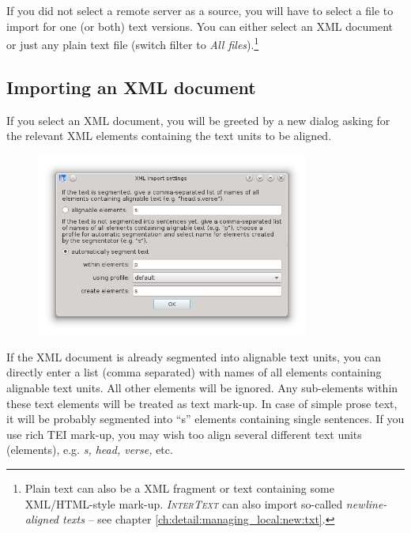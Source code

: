 \documentclass[a4paper,10pt,oneside]{book}
\newcommand{\IT}{\textit{\textsc{InterText}}\xspace}
\begin{document}
If you did not select a remote server as a source, you will have to select a file to import for one (or both) text versions. You can either select an XML document or just any plain text file (switch filter to \emph{All files}).\footnote{Plain text can also be a XML fragment or text containing some XML/HTML-style mark-up. \IT can also import so-called \emph{newline-aligned texts} -- see chapter \ref{ch:detail:managing_local:new:txt}.}

\subsection{Importing an XML document}\label{ch:detail:managing_local:new:xml}

If you select an XML document, you will be greeted by a new dialog asking for the relevant XML elements containing the text units to be aligned.

\begin{figure}[htb]
 \includegraphics[width=0.8\textwidth]{screenshots/xml_import.png}
\end{figure}

If the XML document is already segmented into alignable text units, you can directly enter a list (comma separated) with names of all elements containing alignable text units. All other elements will be ignored. Any sub-elements within these text elements will be treated as text mark-up. In case of simple prose text, it will be probably segmented into ``s'' elements containing single sentences. If you use rich TEI mark-up, you may wish too align several different text units (elements), e.g. \emph{s, head, verse,} etc.
\end{document}
